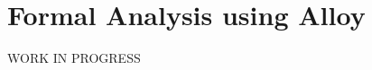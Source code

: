 \documentclass[../rasd.tex]{subfiles}
\begin{document}
\chapter{Formal Analysis using Alloy}
	WORK IN PROGRESS
\end{document}

